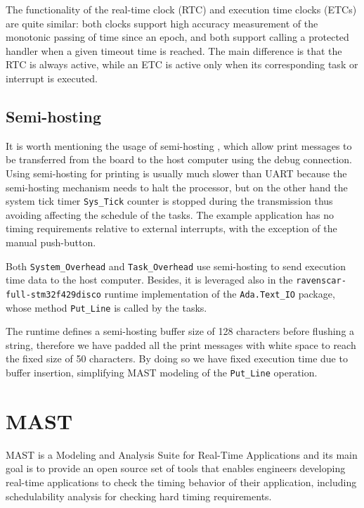 \documentclass{article}
\begin{document}
The functionality of the real-time clock (RTC) and execution time clocks (ETCs) are quite similar: both clocks support high accuracy measurement of the monotonic passing of time since an epoch, and both support calling a protected handler when a given timeout time is reached. The main difference is that the RTC is always active, while an ETC is active only when its corresponding task or interrupt is executed.

\subsection{Semi-hosting}

It is worth mentioning the usage of semi-hosting \cite{semihosting}, which allow print messages to be transferred from the board to the host computer using the debug connection. Using semi-hosting for printing is usually much slower than UART because the semi-hosting mechanism needs to halt the processor, but on the other hand the system tick timer \texttt{Sys\_Tick} counter is stopped during the transmission thus avoiding affecting the schedule of the tasks. The example application has no timing requirements relative to external interrupts, with the exception of the manual push-button.

Both \texttt{System\_Overhead} and \texttt{Task\_Overhead} use semi-hosting to send execution time data to the host computer. Besides, it is leveraged also in the \texttt{ravenscar-full-stm32f429disco} runtime implementation of the \texttt{Ada.Text\_IO} package, whose method \texttt{Put\_Line} is called by the tasks.

The runtime defines a semi-hosting buffer size of 128 characters before flushing a string, therefore we have padded all the print messages with white space to reach the fixed size of 50 characters. By doing so we have fixed execution time due to buffer insertion, simplifying MAST modeling of the \texttt{Put\_Line} operation.

\section{MAST}

MAST \cite{mast} is a Modeling and Analysis Suite for Real-Time Applications and its main goal is to provide an open source set of tools that enables engineers developing real-time applications to check the timing behavior of their application, including schedulability analysis for checking hard timing requirements.
\end{document}

